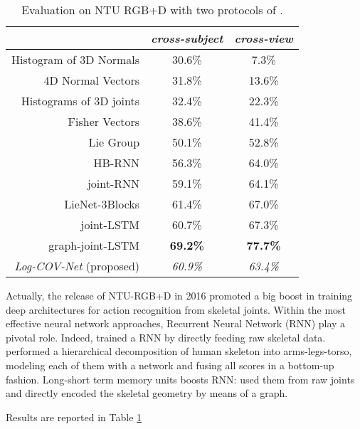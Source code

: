 \documentclass[10pt,twocolumn]{article}
\begin{document}
\begin{table}[h!]
	\centering
	\begin{tabular}{|rcc|}
		\hline
		& {\footnotesize \textit{cross-subject}} & {\footnotesize \textit{cross-view}} \\ \hline\hline
		Histogram of 3D Normals \cite{Hnormal} & 30.6\% & 7.3\% \\
		4D Normal Vectors \cite{normal} & 31.8\% & 13.6\% \\
		Histograms of 3D joints \cite{H3DJ} & 32.4\% & 22.3\% \\
		Fisher Vectors \cite{quads} & 38.6\% & 41.4\% \\
		Lie Group \cite{Vemulapalli:CVPR14} & 50.1\% & 52.8\% \\  
		HB-RNN \cite{Du:CVPR15} & 56.3\% & 64.0\% \\
		joint-RNN \cite{Shahroudy:CVPR16}  & 59.1\% & 64.1\% \\
		LieNet-3Blocks \cite{deeplie} & 61.4\% & 67.0\% \\
		joint-LSTM \cite{Shahroudy:CVPR16} & 60.7\% & 67.3\% \\
		graph-joint-LSTM \cite{Liu:ECCV16} & \textbf{69.2\%} & \textbf{77.7\%} \\ \hline \hline
		\textit{\textit{Log-COV-Net} } (proposed) & \textit{60.9\%} & \textit{63.4\%} \\ \hline
	\end{tabular}\vspace{5pt}
	\caption{Evaluation on NTU RGB+D with two protocols of \cite{Shahroudy:CVPR16}.}
	\label{tab:NTU}
\end{table}

Actually, the release of NTU-RGB+D in 2016 promoted a big boost in training deep architectures for action recognition from skeletal joints. Within the most effective neural network approaches, Recurrent Neural Network (RNN) play a pivotal role. Indeed, \cite{Shahroudy:CVPR16} trained a RNN by directly feeding raw skeletal data. \cite{Du:CVPR15} performed a hierarchical decomposition of human skeleton into arms-legs-torso, modeling each of them with a network and fusing all scores in a bottom-up fashion. Long-short term memory units boosts RNN: \cite{Shahroudy:CVPR16} used them from raw joints and \cite{Liu:ECCV16} directly encoded the skeletal geometry by means of a graph. 

Results are reported in Table \ref{tab:NTU}
\end{document}
